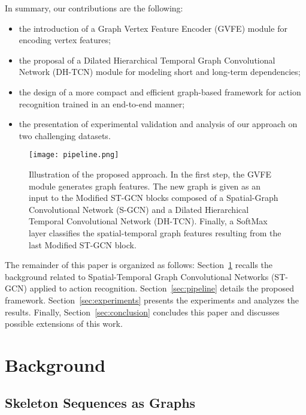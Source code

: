 \documentclass{article}
\begin{document}
In summary, our contributions are the following:
\begin{itemize}
    \item the introduction of a Graph Vertex Feature Encoder (GVFE) module for encoding vertex features;
    \item the proposal of a Dilated Hierarchical Temporal Graph Convolutional Network (DH-TCN) module for modeling short and long-term dependencies;
    \item the design of a more compact and efficient graph-based framework for action recognition trained in an end-to-end manner;
    \item the presentation of experimental validation and analysis of our approach on two challenging datasets.
\end{itemize}


\begin{figure*}[ht!]
\centering 
    \texttt{[image: pipeline.png]}
    \caption{Illustration of the proposed approach. In the first step, the GVFE module generates graph features. The new graph is given as an input to the Modified ST-GCN blocks composed of a Spatial-Graph Convolutional Network (S-GCN) and a Dilated Hierarchical Temporal Convolutional Network (DH-TCN). Finally, a SoftMax layer classifies the spatial-temporal graph features resulting from the last Modified ST-GCN block.}
    \label{fig:pipeline}
\end{figure*}

The remainder of this paper is organized as follows: Section~\ref{sec:background} recalls the background related to Spatial-Temporal Graph Convolutional Networks (ST-GCN) applied to action recognition. Section~\ref{sec:pipeline} details the proposed framework. Section~\ref{sec:experiments} presents the experiments and analyzes the results. Finally, Section~\ref{sec:conclusion} concludes this paper and discusses possible extensions of this work.   












\section{Background}
\label{sec:background}

\subsection{Skeleton Sequences as Graphs}
\end{document}
